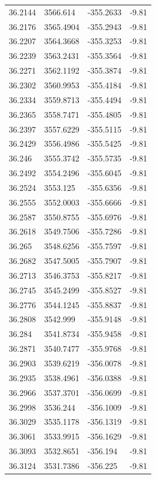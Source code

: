 \begin{table}[H]
\begin{tabular}{llll}
36.2144 & 3566.614 & -355.2633 & -9.81 \\
36.2176 & 3565.4904 & -355.2943 & -9.81 \\
36.2207 & 3564.3668 & -355.3253 & -9.81 \\
36.2239 & 3563.2431 & -355.3564 & -9.81 \\
36.2271 & 3562.1192 & -355.3874 & -9.81 \\
36.2302 & 3560.9953 & -355.4184 & -9.81 \\
36.2334 & 3559.8713 & -355.4494 & -9.81 \\
36.2365 & 3558.7471 & -355.4805 & -9.81 \\
36.2397 & 3557.6229 & -355.5115 & -9.81 \\
36.2429 & 3556.4986 & -355.5425 & -9.81 \\
36.246 & 3555.3742 & -355.5735 & -9.81 \\
36.2492 & 3554.2496 & -355.6045 & -9.81 \\
36.2524 & 3553.125 & -355.6356 & -9.81 \\
36.2555 & 3552.0003 & -355.6666 & -9.81 \\
36.2587 & 3550.8755 & -355.6976 & -9.81 \\
36.2618 & 3549.7506 & -355.7286 & -9.81 \\
36.265 & 3548.6256 & -355.7597 & -9.81 \\
36.2682 & 3547.5005 & -355.7907 & -9.81 \\
36.2713 & 3546.3753 & -355.8217 & -9.81 \\
36.2745 & 3545.2499 & -355.8527 & -9.81 \\
36.2776 & 3544.1245 & -355.8837 & -9.81 \\
36.2808 & 3542.999 & -355.9148 & -9.81 \\
36.284 & 3541.8734 & -355.9458 & -9.81 \\
36.2871 & 3540.7477 & -355.9768 & -9.81 \\
36.2903 & 3539.6219 & -356.0078 & -9.81 \\
36.2935 & 3538.4961 & -356.0388 & -9.81 \\
36.2966 & 3537.3701 & -356.0699 & -9.81 \\
36.2998 & 3536.244 & -356.1009 & -9.81 \\
36.3029 & 3535.1178 & -356.1319 & -9.81 \\
36.3061 & 3533.9915 & -356.1629 & -9.81 \\
36.3093 & 3532.8651 & -356.194 & -9.81 \\
36.3124 & 3531.7386 & -356.225 & -9.81 \\

\end{tabular}
\end{table}
